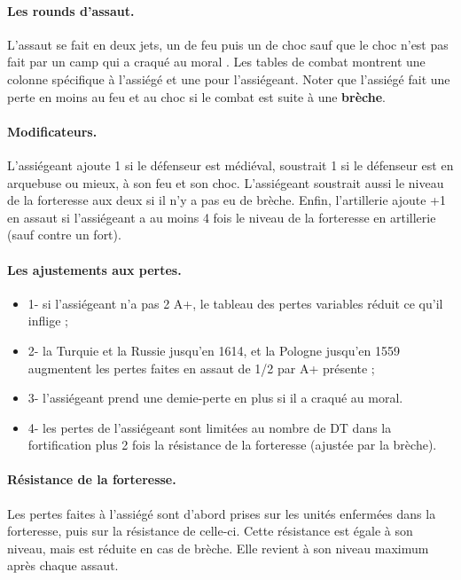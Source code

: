 \paragraph{Les rounds d'assaut.}
L'assaut se fait en deux jets, un de feu puis un de choc sauf que
le choc n'est pas fait par un camp qui a craqué au moral .
Les tables de combat montrent une colonne spécifique à l'assiégé et une pour l'assiégeant.
Noter que l'assiégé fait une perte en moins au feu et au choc si le combat est
suite à une \textbf{brèche}.


\paragraph{Modificateurs.}
L'assiégeant ajoute 1 si le défenseur est médiéval, soustrait 1 si le défenseur est en arquebuse
ou mieux, à son feu et son choc.
L'assiégeant soustrait aussi le niveau de la forteresse aux deux si il n'y a pas eu de
brèche. Enfin, l'artillerie ajoute  +1 en assaut si l'assiégeant a au moins
4 fois le niveau de la forteresse en artillerie (sauf contre un fort).

\paragraph{Les ajustements aux pertes.}
\begin{itemize}
\item 1- si l'assiégeant n'a pas 2 A+, le tableau des pertes variables réduit
ce qu'il inflige ;
\item 2- la Turquie et la Russie jusqu'en 1614, et la Pologne jusqu'en 1559 augmentent
les pertes faites en assaut de 1/2 par A+ présente ;
\item 3- l'assiégeant prend une demie-perte en plus si il a craqué au moral.
\item 4- les pertes de l'assiégeant sont limitées au nombre de DT dans la
fortification plus 2 fois la résistance de
la forteresse (ajustée par la brèche).
\end{itemize}

\paragraph{Résistance de la forteresse.}
Les pertes faites à l'assiégé sont d'abord prises sur les unités enfermées dans
la forteresse, puis sur la résistance de celle-ci. Cette résistance est égale à
son niveau, mais est réduite en cas de brèche. Elle revient à son niveau
maximum après chaque assaut.

